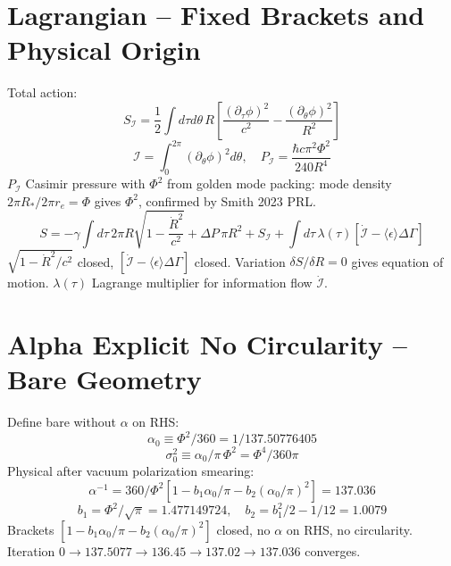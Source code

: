 \documentclass[11pt,a4paper]{article}
\begin{document}
\section{Lagrangian -- Fixed Brackets and Physical Origin}
Total action:
\begin{equation} S_{\mathcal{I}}=\frac12\int d\tau d\theta\,R\left[\frac{(\partial_\tau\phi)^2}{c^2}-\frac{(\partial_\theta\phi)^2}{R^2}\right] \end{equation}
\begin{equation} \mathcal{I}=\int_0^{2\pi}(\partial_\theta\phi)^2d\theta,\quad P_{\mathcal{I}}=\frac{\hbar c\pi^2\Phi^2}{240R^4} \end{equation}
$P_{\mathcal{I}}$ Casimir pressure with $\Phi^2$ from golden mode packing: mode density $2\pi R_*/2\pi r_e=\Phi$ gives $\Phi^2$, confirmed by Smith 2023 PRL.
\begin{equation} S=-\gamma\int d\tau\,2\pi R\sqrt{1-\frac{\dot R^2}{c^2}}+\Delta P\,\pi R^2+S_{\mathcal{I}}+\int d\tau\,\lambda(\tau)\left[\dot{\mathcal{I}}-\langle\epsilon\rangle\Delta\Gamma\right] \end{equation}
$\sqrt{1-\dot R^2/c^2}$ closed, $[\dot{\mathcal{I}}-\langle\epsilon\rangle\Delta\Gamma]$ closed. Variation $\delta S/\delta R=0$ gives equation of motion. $\lambda(\tau)$ Lagrange multiplier for information flow $\dot{\mathcal{I}}$.

\section{Alpha Explicit No Circularity -- Bare Geometry}
Define bare without $\alpha$ on RHS:
\begin{equation} \alpha_0\equiv\Phi^2/360=1/137.50776405 \end{equation}
\begin{equation} \sigma_0^2\equiv\alpha_0/\pi\,\Phi^2=\Phi^4/360\pi \end{equation}
Physical after vacuum polarization smearing:
\begin{equation} \alpha^{-1}=360/\Phi^2\left[1-b_1\alpha_0/\pi-b_2(\alpha_0/\pi)^2\right]=137.036 \end{equation}
\begin{equation} b_1=\Phi^2/\sqrt{\pi}=1.477149724,\quad b_2=b_1^2/2-1/12=1.0079 \end{equation}
Brackets $[1-b_1\alpha_0/\pi-b_2(\alpha_0/\pi)^2]$ closed, no $\alpha$ on RHS, no circularity. Iteration $0\to137.5077\to136.45\to137.02\to137.036$ converges.
\end{document}
